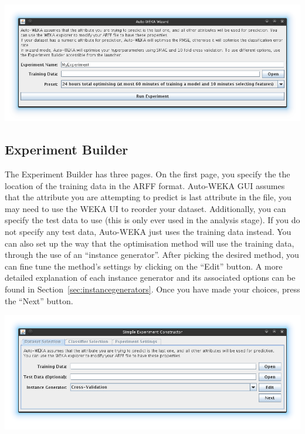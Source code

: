 \begin{center}
  \includegraphics[scale=0.7]{guiscreens/wizard.png}
\end{center}

\subsection{Experiment Builder}

The Experiment Builder has three pages. On the first page, you specify the the location of the training data in the ARFF format. Auto-WEKA GUI assumes that the attribute you are attempting to predict is last attribute in the file,  you may need to use the WEKA UI to reorder your dataset. Additionally, you can specify the test data to use (this is only ever used in the analysis stage). If you do not specify any test data, Auto-WEKA just uses the training data instead. You can also set up the way that the optimisation method will use the training data,  through the use of an ``instance generator''. After picking the desired method, you can fine tune the method's settings by clicking on the ``Edit'' button. A more detailed explanation of each instance generator and its associated options can be found in Section~\ref{sec:instancegenerators}. Once you have made your choices, press the ``Next'' button.

\begin{center}
  \includegraphics[scale=0.7]{guiscreens/builder-dataset.png}
\end{center}

